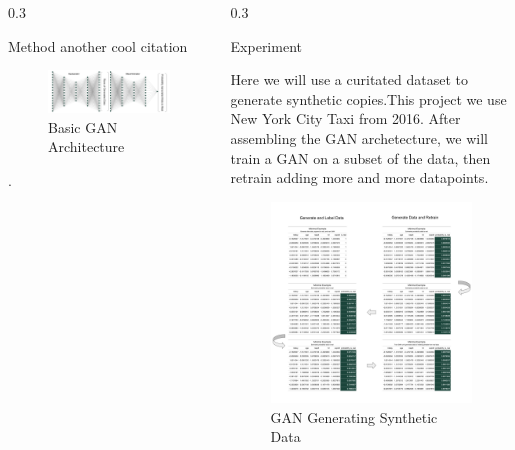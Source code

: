 \documentclass{msuposter}
\newcommand{\colwidth}{0.3\linewidth}
\begin{document}
\begin{frame}{}
\begin{columns}[t]
\begin{column}{\colwidth}
\begin{block}{Method}
another cool citation\cite{hung}

\begin{figure}
  \includegraphics[width=\linewidth]{gan_diag.png}
    	\caption{\label{fig:my-label} Basic GAN Architecture}
\end{figure}

\newpage 



\end{block}. 


\end{column}


\begin{column}{\colwidth}

\begin{block}{Experiment}

Here we will use a curitated dataset to generate synthetic copies.This project we use New York City Taxi from 2016\cite{nyc2016}. After assembling the GAN archetecture, we will train a GAN on a subset of the data, then retrain adding more and more datapoints. 

\begin{figure}
  \includegraphics[width=\linewidth]{gan_conv.png}
      	\caption{\label{fig:my-label} GAN Generating Synthetic Data}
\end{figure}




\end{block}
\end{column}
\end{columns}
\end{frame}
\end{document}
